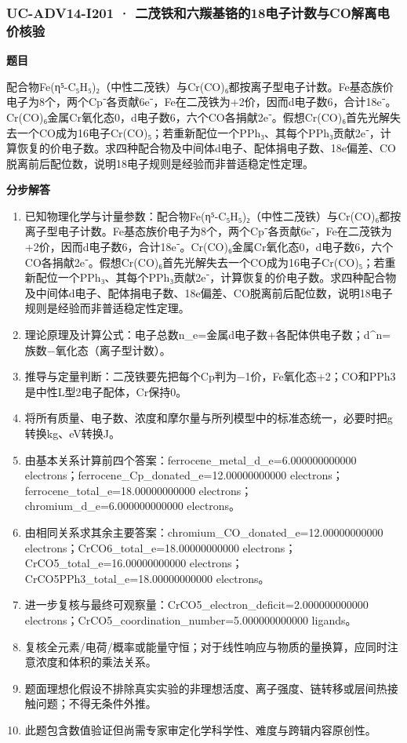 \documentclass[UTF8,11pt,a4paper]{ctexart}
\begin{document}
\subsubsection*{UC-ADV14-I201 · 二茂铁和六羰基铬的18电子计数与CO解离电价核验}
\noindent\textbf{题目}\par
配合物Fe(η⁵-C₅H₅)₂（中性二茂铁）与Cr(CO)₆都按离子型电子计数。Fe基态族价电子为8个，两个Cp⁻各贡献6e⁻，Fe在二茂铁为+2价，因而d电子数6，合计18e⁻。Cr(CO)₆金属Cr氧化态0，d电子数6，六个CO各捐献2e⁻。假想Cr(CO)₆首先光解失去一个CO成为16电子Cr(CO)₅；若重新配位一个PPh₃、其每个PPh₃贡献2e⁻，计算恢复的价电子数。求四种配合物及中间体d电子、配体捐电子数、18e偏差、CO脱离前后配位数，说明18电子规则是经验而非普适稳定性定理。\par
\medskip\noindent\textbf{分步解答}
\begin{enumerate}
\item 已知物理化学与计量参数：配合物Fe(η⁵-C₅H₅)₂（中性二茂铁）与Cr(CO)₆都按离子型电子计数。Fe基态族价电子为8个，两个Cp⁻各贡献6e⁻，Fe在二茂铁为+2价，因而d电子数6，合计18e⁻。Cr(CO)₆金属Cr氧化态0，d电子数6，六个CO各捐献2e⁻。假想Cr(CO)₆首先光解失去一个CO成为16电子Cr(CO)₅；若重新配位一个PPh₃、其每个PPh₃贡献2e⁻，计算恢复的价电子数。求四种配合物及中间体d电子、配体捐电子数、18e偏差、CO脱离前后配位数，说明18电子规则是经验而非普适稳定性定理。
\item 理论原理及计算公式：电子总数n\_e=金属d电子数+各配体供电子数；d\textasciicircum{}n=族数−氧化态（离子型计数）。
\item 推导与定量判断：二茂铁要先把每个Cp判为−1价，Fe氧化态+2；CO和PPh3是中性L型2电子配体，Cr保持0。
\item 将所有质量、电子数、浓度和摩尔量与所列模型中的标准态统一，必要时把g转换kg、eV转换J。
\item 由基本关系计算前四个答案：ferrocene\_metal\_d\_e=6.000000000000 electrons；ferrocene\_Cp\_donated\_e=12.00000000000 electrons；ferrocene\_total\_e=18.00000000000 electrons；chromium\_d\_e=6.000000000000 electrons。
\item 由相同关系求其余主要答案：chromium\_CO\_donated\_e=12.00000000000 electrons；CrCO6\_total\_e=18.00000000000 electrons；CrCO5\_total\_e=16.00000000000 electrons；CrCO5PPh3\_total\_e=18.00000000000 electrons。
\item 进一步复核与最终可观察量：CrCO5\_electron\_deficit=2.000000000000 electrons；CrCO5\_coordination\_number=5.000000000000 ligands。
\item 复核全元素/电荷/概率或能量守恒；对于线性响应与物质的量换算，应同时注意浓度和体积的乘法关系。
\item 题面理想化假设不排除真实实验的非理想活度、离子强度、链转移或层间热接触问题；不得无条件外推。
\item 此题包含数值验证但尚需专家审定化学科学性、难度与跨辑内容原创性。
\end{enumerate}
\end{document}
